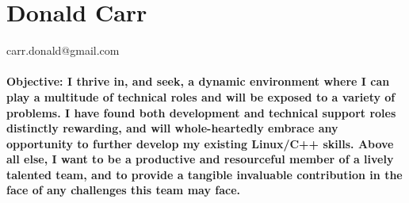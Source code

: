 \documentclass{article}
\begin{document}
\centering
\section*{Donald Carr}
carr.donald@gmail.com \\
\hspace*{\fill} \\

\bf{Objective:}
I thrive in, and seek, a dynamic environment where I can play a multitude of technical roles and will be exposed to a variety of problems. I have found both development and technical support roles distinctly rewarding, and will whole-heartedly embrace any opportunity to further develop my existing Linux/C++ skills. Above all else, I want to be a productive and resourceful member of a lively talented team, and to provide a tangible invaluable contribution in the face of any challenges this team may face.
\end{document}
